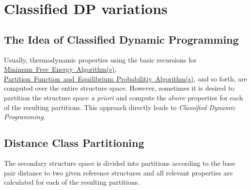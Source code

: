  \hypertarget{classified_dp}{}\section{Classified DP variations}\label{classified_dp}
\hypertarget{classified_dp_classified_dp_intro}{}\subsection{The Idea of Classified Dynamic Programming}\label{classified_dp_classified_dp_intro}
Usually, thermodynamic properties using the basic recursions for \mbox{\hyperlink{mfe_algorithm}{Minimum Free Energy Algorithm(s)}}, \mbox{\hyperlink{pf_algorithm}{Partition Function and Equilibrium Probabilitiy Algorithm(s)}}, and so forth, are computed over the entire structure space. However, sometimes it is desired to partition the structure space {\itshape a priori} and compute the above properties for each of the resulting partitions. This approach directly leads to {\itshape Classified Dynamic Programming}.\hypertarget{classified_dp_distance_classes}{}\subsection{Distance Class Partitioning}\label{classified_dp_distance_classes}
The secondary structure space is divided into partitions according to the base pair distance to two given reference structures and all relevant properties are calculated for each of the resulting partitions.

